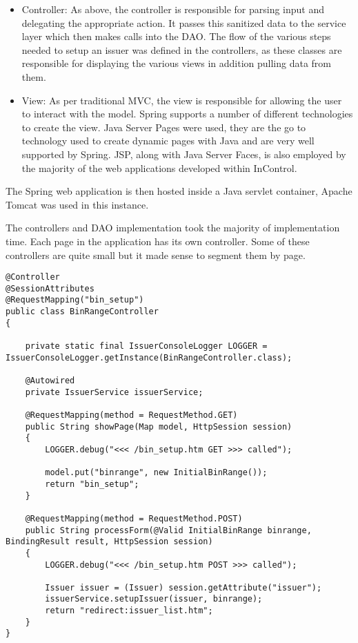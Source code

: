 \documentclass[a4paper, 11pt, titlepage]{article}
\begin{document}
\begin{itemize}
\item Controller: As above, the controller is responsible for parsing input and delegating the appropriate action. It passes this sanitized data to the service layer which then makes calls into the DAO. The flow of the various steps needed to setup an issuer was defined in the controllers, as these classes are responsible for displaying the various views in addition pulling data from them. 
\item View: As per traditional MVC, the view is responsible for allowing the user to interact with the model. Spring supports a number of different technologies to create the view. Java Server Pages were used, they are the go to technology used to create dynamic pages with Java and are very well supported by Spring. JSP, along with Java Server Faces, is also employed by the majority of the web applications developed within InControl. 
\end{itemize} 
 
The Spring web application is then hosted inside a Java servlet container, Apache Tomcat was used in this instance. 
 
The controllers and DAO implementation took the majority of implementation time. Each page in the application has its own controller. Some of these controllers are quite small but it made sense to segment them by page.  
 
\begin{verbatim} 
@Controller 
@SessionAttributes 
@RequestMapping("bin_setup") 
public class BinRangeController 
{ 
 
    private static final IssuerConsoleLogger LOGGER = IssuerConsoleLogger.getInstance(BinRangeController.class); 
 
    @Autowired 
    private IssuerService issuerService; 
 
    @RequestMapping(method = RequestMethod.GET) 
    public String showPage(Map model, HttpSession session) 
    { 
        LOGGER.debug("<<< /bin_setup.htm GET >>> called"); 
 
        model.put("binrange", new InitialBinRange()); 
        return "bin_setup"; 
    } 
 
    @RequestMapping(method = RequestMethod.POST) 
    public String processForm(@Valid InitialBinRange binrange, BindingResult result, HttpSession session) 
    { 
        LOGGER.debug("<<< /bin_setup.htm POST >>> called"); 
 
        Issuer issuer = (Issuer) session.getAttribute("issuer"); 
        issuerService.setupIssuer(issuer, binrange); 
        return "redirect:issuer_list.htm"; 
    } 
} 
 
 
\end{verbatim} 
 
\end{document}
